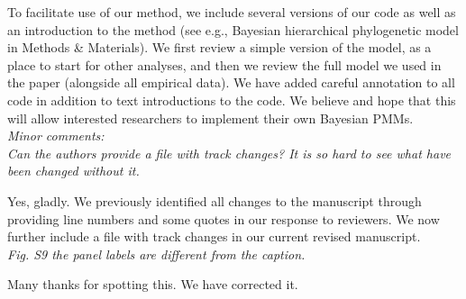\documentclass[11pt]{article}
\begin{document}
To facilitate use of our method, we include several versions of our code as well as an introduction to the method (see e.g., Bayesian hierarchical phylogenetic model in Methods \& Materials). We first review a simple version of the model, as a place to start for other analyses, and then we review the full model we used in the paper (alongside all empirical data). We have added careful annotation to all code in addition to text introductions to the code. We believe and hope that this will allow interested researchers to implement their own Bayesian PMMs. \\


\emph{Minor comments:}\\
\emph{Can the authors provide a file with track changes? It is so hard to see what have been changed without it.}

Yes, gladly. We previously identified all changes to the manuscript through providing line numbers and some quotes in our response to reviewers. We now further include a file with track changes in our current revised manuscript.\\


\emph{Fig. S9 the panel labels are different from the caption.}

Many thanks for spotting this. We have corrected it.\\




\end{document}
